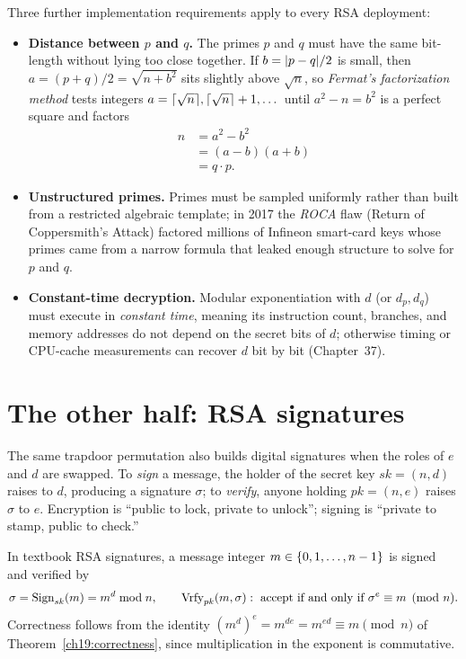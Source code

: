\begin{trapbox}
Three further implementation requirements apply to every RSA deployment:
\begin{itemize}
  \item \textbf{Distance between $p$ and $q$.} The primes $p$ and $q$ must have the same bit-length without lying too close together. If $b = \lvert p-q\rvert/2$ is small, then $a = (p+q)/2 = \sqrt{n + b^2}$ sits slightly above $\sqrt{n}$, so \emph{Fermat's factorization method} tests integers $a = \lceil\sqrt{n}\rceil, \lceil\sqrt{n}\rceil+1, \dots$ until $a^2 - n = b^2$ is a perfect square and factors
  \begin{align*}
    n &= a^2 - b^2 \\
      &= (a - b)(a + b) \\
      &= q \cdot p.
  \end{align*}
  \item \textbf{Unstructured primes.} Primes must be sampled uniformly rather than built from a restricted algebraic template; in 2017 the \emph{ROCA} flaw (Return of Coppersmith's Attack) factored millions of Infineon smart-card keys whose primes came from a narrow formula that leaked enough structure to solve for $p$ and $q$.
  \item \textbf{Constant-time decryption.} Modular exponentiation with $d$ (or $d_p, d_q$) must execute in \emph{constant time}, meaning its instruction count, branches, and memory addresses do not depend on the secret bits of $d$; otherwise timing or CPU-cache measurements can recover $d$ bit by bit (Chapter~37).
\end{itemize}
\end{trapbox}

\section{The other half: RSA signatures}
\label{ch19:signatures}

The same trapdoor permutation also builds digital signatures when the roles of $e$ and $d$ are swapped. To \emph{sign} a message, the holder of the secret key $sk = (n,d)$ raises to $d$, producing a signature $\sigma$; to \emph{verify}, anyone holding $pk = (n,e)$ raises $\sigma$ to $e$. Encryption is ``public to lock, private to unlock''; signing is ``private to stamp, public to check.''

In textbook RSA signatures, a message integer $m \in \{0,1,\dots,n-1\}$ is signed and verified by
\[
  \sigma = \operatorname{Sign}_{sk}(m) = m^{d}\bmod n, \qquad
  \operatorname{Vrfy}_{pk}(m,\sigma) : \ \text{accept if and only if } \sigma^{e}\equiv m \pmod n.
\]
Correctness follows from the identity $(m^d)^e = m^{de} = m^{ed}\equiv m\pmod n$ of Theorem~\ref{ch19:correctness}, since multiplication in the exponent is commutative.

